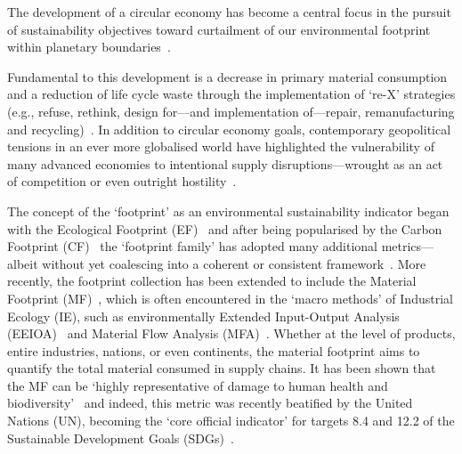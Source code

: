 \documentclass[a4paper,fleqn]{cas-dc}
\begin{document}
The development of a circular economy has become a central focus in the pursuit
of sustainability objectives toward curtailment of our environmental footprint
within planetary boundaries~\citep{eu2019greendeal,	eu2020circ,nl2023ceplan,nl2016ceplan,pardo2018ce,ellenmacarthur2015ce}.

Fundamental to this development is a decrease in primary material consumption
and a reduction of life cycle waste through the implementation of `re-X'
strategies (e.g., refuse, rethink, design for---and implementation of---repair,
remanufacturing and recycling)~\citep{reike2018rex, eu2022ecodesign,
	eu2022repair, eu2015reman}. In addition to circular economy goals, contemporary
geopolitical tensions in an ever more globalised world have highlighted the
vulnerability of many advanced economies to intentional supply
disruptions---wrought as an act of competition or even outright
hostility~\citep{jrc2023supplychain,hartley2024cepolitics,berry2023crm}.

The concept of the `footprint' as an environmental sustainability indicator
began with the Ecological Footprint
(EF)~\citep{wackernagel1994ecologicalfootprint} and after being popularised by
the Carbon Footprint (CF)~\citep{cucek2015environmentalfootprints} the
`footprint family' has adopted many additional metrics---albeit without yet
coalescing into a coherent or consistent
framework~\citep{giampietro2014footprintstonowhere,
	vanham2019footprints,ridoutt2013footprints}. More recently, the footprint
collection has been extended to include the Material Footprint
(MF)~\citep{weidmann2013materialfootprint}, which is often encountered in the
`macro methods' of Industrial Ecology (IE), such as environmentally Extended
Input-Output Analysis (EEIOA)~\citep{lenzen2022materialfootprint} and Material
Flow Analysis (MFA)~\citep{schaffartzik2013mfafootprint}. Whether at the level
of products, entire industries, nations, or even continents, the material
footprint aims to quantify the total material consumed in supply chains. It has
been shown that the MF can be `highly representative of damage to human health
and biodiversity'~\citep{steinmann2017resourcefootprints} and indeed, this
metric was recently beatified by the United Nations (UN), becoming the `core
official indicator' for targets 8.4 and 12.2 of the Sustainable Development
Goals (SDGs)~\citep{lenzen2022materialfootprint}.
\end{document}
